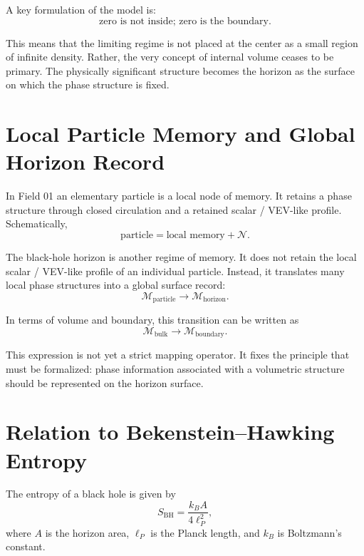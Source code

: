 \documentclass[11pt,a4paper]{article}
\newcommand{\normal}{\mathcal{N}}
\newcommand{\memory}{\mathcal{M}}
\newcommand{\bulk}{\mathrm{bulk}}
\newcommand{\boundary}{\mathrm{boundary}}
\begin{document}
A key formulation of the model is:
\begin{equation}
\text{zero is not inside; zero is the boundary.}
\end{equation}

This means that the limiting regime is not placed at the center as a small region of infinite density. Rather, the very concept of internal volume ceases to be primary. The physically significant structure becomes the horizon as the surface on which the phase structure is fixed.

\section{Local Particle Memory and Global Horizon Record}

In Field 01 an elementary particle is a local node of memory. It retains a phase structure through closed circulation and a retained scalar / VEV-like profile. Schematically,
\begin{equation}
\text{particle} = \text{local memory} + \normal.
\end{equation}

The black-hole horizon is another regime of memory. It does not retain the local scalar / VEV-like profile of an individual particle. Instead, it translates many local phase structures into a global surface record:
\begin{equation}
\memory_{\mathrm{particle}} \longrightarrow \memory_{\mathrm{horizon}}.
\end{equation}

In terms of volume and boundary, this transition can be written as
\begin{equation}
\memory_{\bulk} \longrightarrow \memory_{\boundary}.
\end{equation}

This expression is not yet a strict mapping operator. It fixes the principle that must be formalized: phase information associated with a volumetric structure should be represented on the horizon surface.

\section{Relation to Bekenstein--Hawking Entropy}

The entropy of a black hole is given by
\begin{equation}
S_{\mathrm{BH}} = \frac{k_B A}{4\ell_P^2},
\end{equation}
where $A$ is the horizon area, $\ell_P$ is the Planck length, and $k_B$ is Boltzmann's constant.
\end{document}
